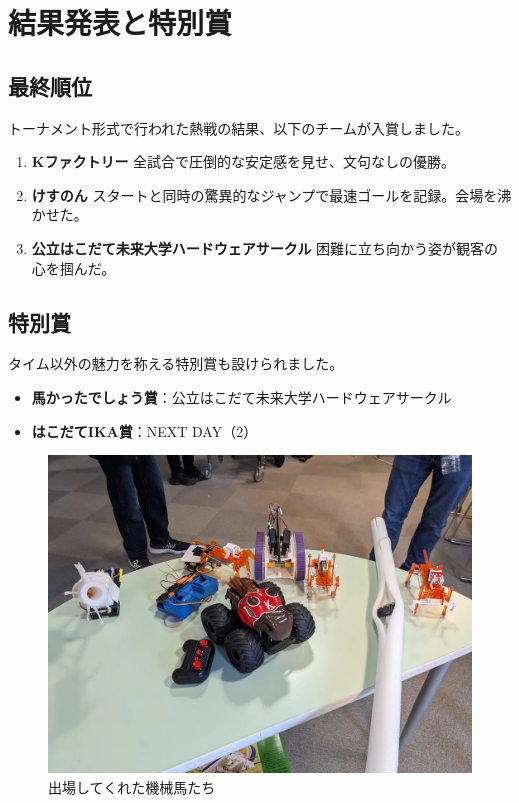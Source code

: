 \chapter{結果発表と特別賞}
\section{最終順位}
トーナメント形式で行われた熱戦の結果、以下のチームが入賞しました。

\begin{enumerate}
  \item \textbf{Kファクトリー}  
  全試合で圧倒的な安定感を見せ、文句なしの優勝。
  
  \item \textbf{けすのん}  
  スタートと同時の驚異的なジャンプで最速ゴールを記録。会場を沸かせた。
  
  \item \textbf{公立はこだて未来大学ハードウェアサークル}  
  困難に立ち向かう姿が観客の心を掴んだ。
\end{enumerate}

\section{特別賞}
タイム以外の魅力を称える特別賞も設けられました。

\begin{itemize}
  \item \textbf{馬かったでしょう賞}：公立はこだて未来大学ハードウェアサークル
  
  \item \textbf{はこだてIKA賞}：NEXT DAY（2）
\end{itemize}

\begin{figure}[h]
\centering
\includegraphics[width=0.7\linewidth]{pages/images/all-robots.png}
\caption{出場してくれた機械馬たち}
\end{figure}

